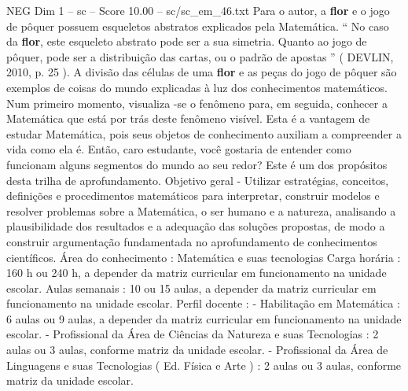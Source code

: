 \begin{textsample}{NEG Dim 1 – sc – Score 10.00 – sc/sc\_em\_46.txt}
Para o autor, a \textbf{flor} e o jogo de pôquer possuem esqueletos abstratos explicados pela Matemática. “ No caso da \textbf{flor}, este esqueleto abstrato pode ser a sua simetria.
Quanto ao jogo de pôquer, pode ser a distribuição das cartas, ou o padrão de apostas ” ( DEVLIN, 2010, p. 25 ).
A divisão das células de uma \textbf{flor} e as peças do jogo de pôquer são exemplos de coisas do mundo explicadas à luz dos conhecimentos matemáticos.
Num primeiro momento, visualiza -se o fenômeno para, em seguida, conhecer a Matemática que está por trás deste fenômeno visível.
Esta é a vantagem de estudar Matemática, pois seus objetos de conhecimento auxiliam a compreender a vida como ela é.
Então, caro estudante, você gostaria de entender como funcionam alguns segmentos do mundo ao seu redor?
Este é um dos propósitos desta trilha de aprofundamento.
Objetivo geral - Utilizar estratégias, conceitos, definições e procedimentos matemáticos para interpretar, construir modelos e resolver problemas sobre a Matemática, o ser humano e a natureza, analisando a plausibilidade dos resultados e a adequação das soluções propostas, de modo a construir argumentação fundamentada no aprofundamento de conhecimentos científicos.
Área do conhecimento : Matemática e suas tecnologias Carga horária : 160 h ou 240 h, a depender da matriz curricular em funcionamento na unidade escolar.
Aulas semanais : 10 ou 15 aulas, a depender da matriz curricular em funcionamento na unidade escolar.
Perfil docente : - Habilitação em Matemática : 6 aulas ou 9 aulas, a depender da matriz curricular em funcionamento na unidade escolar. - Profissional da Área de Ciências da Natureza e suas Tecnologias : 2 aulas ou 3 aulas, conforme matriz da unidade escolar. - Profissional da Área de Linguagens e suas Tecnologias ( Ed.
Física e Arte ) : 2 aulas ou 3 aulas, conforme matriz da unidade escolar.

\end{textsample}
